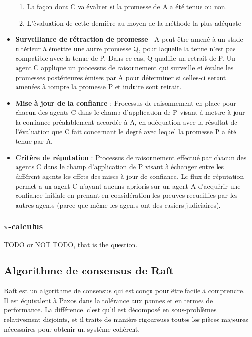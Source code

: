 \begin{itemize}
  	\begin{enumerate}
	  \item La façon dont C va évaluer si la promesse de A a été tenue ou
		  non.
      \item L'évaluation de cette dernière au moyen de la méthode la plus
          adéquate
  	\end{enumerate}
  \item \textbf{Surveillance de rétraction de promesse} :
	A peut être amené à un stade ultérieur à émettre une autre promesse Q,
	pour laquelle la tenue n'est pas compatible avec la tenue de P. Dans ce
	cas, Q qualifie un retrait de P. Un agent C applique un processus de
	raisonnement qui surveille et évalue les promesses postérieures émises
	par A pour déterminer si celles-ci seront amenées à rompre la promesse P
	et induire sont retrait.
  \item \textbf{Mise à jour de la confiance} :
	Processus de raisonnement en place pour chacun des agents C dans le champ
	d'application de P visant à mettre à jour la confiance préalablement
	accordée à A, en adéquation avec la résultat de l'évaluation que C fait
	concernant le degré avec lequel la promesse P a été tenue par A.
  \item \textbf{Critère de réputation} :
	Processus de raisonnement effectué par chacun des agents C dans le champ
	d'application de P visant à échanger entre les différent agents les
	effets des mises à jour de confiance. Le flux de réputation permet a un
	agent C n'ayant aucuns aprioris sur un agent A d'acquérir une confiance
	initiale en prenant en considération les preuves recueillies par les
    autres agents (parce que même les agents ont des casiers judiciaires).
\end{itemize}

\subsubsection{$\pi$-calculus}

TODO or NOT TODO, that is the question.

\subsection{Algorithme de consensus de Raft}

Raft est un algorithme de consensus qui est conçu pour être facile à comprendre.
Il est équivalent à Paxos dans la tolérance aux pannes et en termes de
performance. La différence, c'est qu'il est décomposé en sous-problèmes
relativement disjoints, et il traite de manière rigoureuse toutes les pièces
majeures nécessaires pour obtenir un système cohérent.

